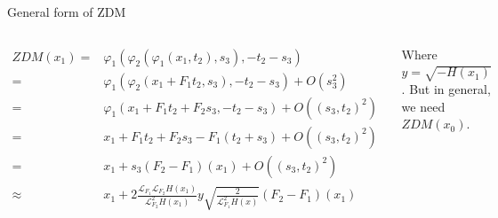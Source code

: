 \documentclass[xcolor=x11names,compress]{beamer}
\renewcommand{\(}{\begin{columns}}
\renewcommand{\)}{\end{columns}}
\newcommand{\<}[1]{\begin{column}{#1}}
\renewcommand{\>}{\end{column}}
\newcommand{\lien}[2]{\mathcal{L}_{#1}^{#2}}
\newcommand{\lie}[1]{\mathcal{L}_{#1}}
\begin{document}
\begin{frame}{General form of ZDM}
\begin{columns}[c]
\begin{align*}
ZDM(x_1)=&\varphi_1(\varphi_2(\varphi_1(x_1,t_2),s_3),-t_2-s_3)\\
=&\varphi_1(\varphi_2(x_1+F_1t_2,s_3),-t_2-s_3)+O(s_3^2)\\
=&\varphi_1(x_1+F_1t_2+F_2s_3,-t_2-s_3)+O((s_3,t_2)^2)\\
=&x_1+F_1t_2+F_2s_3-F_1(t_2+s_3)+O((s_3,t_2)^2)\\
=&x_1+s_3(F_2-F_1)(x_1)+O((s_3,t_2)^2)\\
\approx&x_1+2\frac{\lie{F_1}\lie{F_2}H(x_1)}{\lien{F_2}{2}H(x_1)}y\sqrt{\frac{2}{\lien{F_1}{2}H(x)}}(F_2-F_1)(x_1)
\end{align*}

Where $y=\sqrt{-H(x_1)}$.  
But in general, we need $ZDM(x_0)$.  
\begin{center}
\includegraphics[width=\textwidth]{ZDM}
\end{center}
\end{columns}
\end{frame}
\end{document}
